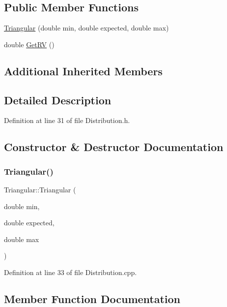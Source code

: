 \subsection*{Public Member Functions}
\begin{DoxyCompactItemize}
\item 
\hyperlink{class_triangular_a724f8bda0e9c81da0242ad674c17aba2}{Triangular} (double min, double expected, double max)
\item 
double \hyperlink{class_triangular_aadd53c452801be8c0eb6ffb31a299835}{Get\+RV} ()
\end{DoxyCompactItemize}
\subsection*{Additional Inherited Members}


\subsection{Detailed Description}


Definition at line 31 of file Distribution.\+h.



\subsection{Constructor \& Destructor Documentation}
\mbox{\label{class_triangular_a724f8bda0e9c81da0242ad674c17aba2}} 
\subsubsection{\texorpdfstring{Triangular()}{Triangular()}}
{\footnotesize\ttfamily Triangular\+::\+Triangular (\begin{DoxyParamCaption}\item[{double}]{min,  }\item[{double}]{expected,  }\item[{double}]{max }\end{DoxyParamCaption})}



Definition at line 33 of file Distribution.\+cpp.



\subsection{Member Function Documentation}
\mbox{\label{class_triangular_aadd53c452801be8c0eb6ffb31a299835}} 
